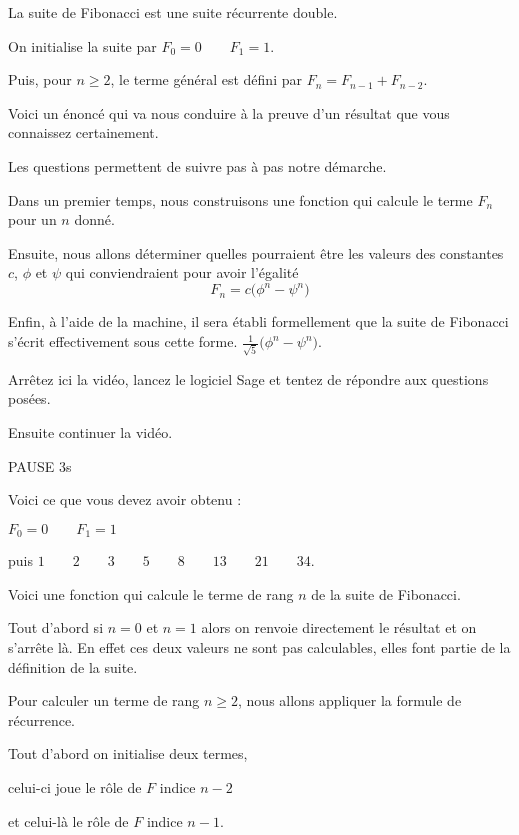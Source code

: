 \diapo

La suite de Fibonacci est une suite récurrente double.

On initialise la suite par 
$F_0 = 0 \qquad F_1 = 1$.

Puis, pour $n\ge 2$, le terme général est défini par 
$F_{n} = F_{n-1} + F_{n-2}$.

\change
Voici un énoncé qui va nous conduire à la preuve d'un résultat que vous connaissez certainement.

Les questions permettent de suivre pas à pas notre démarche.

Dans un premier temps, nous construisons une fonction qui
calcule le terme $F_n$ pour un $n$ donné.

Ensuite, nous allons déterminer quelles pourraient être les valeurs des constantes $c$, $\phi$ et $\psi$ qui 
conviendraient pour avoir l'égalité
$$F_n = c \big(\phi^n-\psi^n\big)$$

Enfin, à l'aide de la machine, il sera établi formellement 
que la suite de Fibonacci s'écrit effectivement
sous cette forme.  $\frac{1}{\sqrt{5}}  \big(\phi^n-\psi^n\big)$.


Arrêtez ici la vidéo, lancez le logiciel Sage et tentez de répondre aux questions posées.

Ensuite continuer la vidéo.

PAUSE 3s


\diapo

Voici ce que vous devez avoir obtenu :

$F_0 = 0 \qquad F_1 = 1$ 

puis  
$1 \qquad 2 \qquad 3 \qquad 5 \qquad 8 \qquad 13 \qquad 21\qquad 34 $.


\change

Voici une fonction qui calcule le terme de rang $n$ de 
la suite de Fibonacci.

Tout d'abord si $n=0$ et $n=1$ alors on renvoie directement le résultat et on s'arrête là. En effet ces deux valeurs ne sont pas calculables, elles font partie de la définition de la suite.

Pour calculer un terme de rang $n\ge2$, nous allons appliquer 
la formule de récurrence.

Tout d'abord on initialise deux termes, 

celui-ci joue le rôle de
$F$ indice $n-2$ 

et celui-là le rôle de $F$ indice $n-1$.

